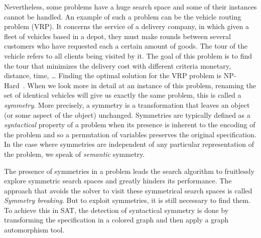 Nevertheless, some problems have a huge search space and some of their instances cannot be handled.
An example of such a problem can be the vehicle routing problem (VRP).
It concerns the service of a delivery company, in which
given a fleet of vehicles based in a depot, they must make rounds between several customers  who have requested
each a certain amount of goods. The tour of the vehicle refers to all clients being visited by it. 
The goal of this problem is to find the tour that minimizes the delivery cost with different criteria monetary, distance, time, …
Finding the optimal solution for the VRP problem is NP-Hard~\cite{toth2002vehicle}.
When we look more in detail at an instance of this problem, renaming the set of identical vehicles will give us exactly the same problem,
this is called a \textit{symmetry}. More precisely, a symmetry is a transformation that leaves an object (or some aspect of the object) unchanged. Symmetries are typically defined as a \textit{syntactical} property of a problem when its presence is inherent to the encoding of the problem and so a permutation of variables preserves the original specification. In the case where symmetries are independent of any 
particular representation of the problem, we speak of \textit{semantic} symmetry.

The presence of symmetries in a problem leads the search algorithm to fruitlessly explore symmetric
search spaces and greatly hinders its performance.
 The approach that avoids the solver to visit these symmetrical search spaces is called \textit{Symmetry breaking}.
But to exploit symmetries, it is still necessary to find them.
To achieve this in SAT, the detection of syntactical symmetry is done by transforming the specification
in a colored graph and then apply a graph automorphism tool.


%
%
%
%
%
%
%
%
%

